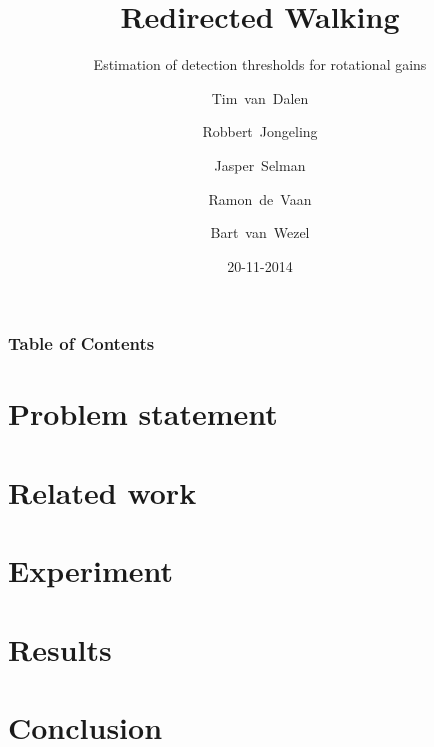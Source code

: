 \documentclass[12pt,aspectratio=169]{beamer} %
\title{Redirected Walking}
\subtitle{Estimation of detection thresholds for rotational gains}
\author{Tim~van~Dalen \and Robbert~Jongeling \and Jasper~Selman\\[0.3cm]\and Ramon~de~Vaan \and Bart~van~Wezel}
\date{20-11-2014}
\begin{document}
\begin{titleframe}
\end{titleframe}

\begin{frame}
	\frametitle{Table of Contents}
	\tableofcontents
\end{frame}

\section{Problem statement}


\section{Related work}


\section{Experiment}


\section{Results}


\section{Conclusion}

\end{document}
